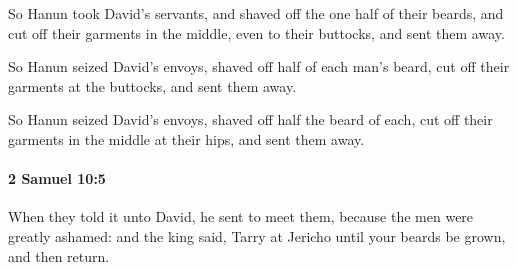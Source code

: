 			\begin{versebox}
					\item[BHS] 
					\item[ASV] So Hanun took David's servants, and shaved off the one half of their beards, and cut off their garments in the middle, even to their buttocks, and sent them away.
					\item[NIV] So Hanun seized David’s envoys, shaved off half of each man’s beard, cut off their garments at the buttocks, and sent them away.
					\item[NRSV] So Hanun seized David’s envoys, shaved off half the beard of each, cut off their garments in the middle at their hips, and sent them away.
			\end{versebox}

		\paragraph{2 Samuel 10:5} %
			\label{2SAMUEL-10-5}

			When they told it unto David, he sent to meet them, because the men were greatly ashamed: and the king said, Tarry at Jericho until your beards be grown, and then return.

